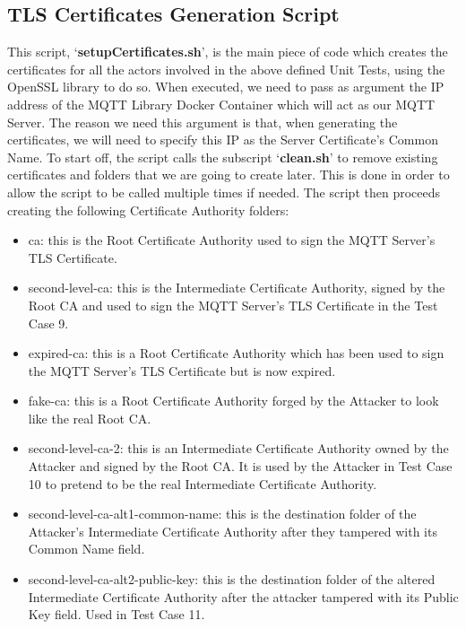 \documentclass[binding=0.6cm,noexaminfo]{sapthesis}
\begin{document}
\subsection{TLS Certificates Generation Script}

This script, `\textbf{setupCertificates.sh}', is the main piece of code which creates the certificates for all the actors involved in the above defined Unit Tests, using the OpenSSL library to do so. When executed, we need to pass as argument the IP address of the  MQTT Library Docker Container which will act as our MQTT Server. The reason we need this argument is that, when generating the certificates, we will need to specify this IP as the Server Certificate’s Common Name.
To start off, the script calls the subscript `\textbf{clean.sh}' to remove existing certificates and folders that we are going to create later. This is done in order to allow the script to be called multiple times if needed. The script then proceeds creating the following Certificate Authority folders:
\begin{itemize}
	\item ca: this is the Root Certificate Authority used to sign the MQTT Server’s TLS Certificate.
	\item second-level-ca: this is the Intermediate Certificate Authority, signed by the  Root CA and used to sign the MQTT Server’s TLS Certificate in the Test Case 9.
	\item expired-ca: this is a Root Certificate Authority which has been used to sign the MQTT Server’s TLS Certificate but is now expired.
	\item fake-ca: this is a Root Certificate Authority forged by the Attacker to look like the real Root CA.
	\item second-level-ca-2: this is an Intermediate Certificate Authority owned by the Attacker and signed by the Root CA. It is used by the Attacker in Test Case 10  to pretend to be the real Intermediate Certificate Authority.
	\item second-level-ca-alt1-common-name: this is the destination folder of the Attacker’s Intermediate Certificate Authority after they tampered with its Common Name field.
	\item second-level-ca-alt2-public-key: this is the destination folder of the altered  Intermediate Certificate Authority after the attacker tampered with its Public Key field. Used in Test Case 11.
\end{itemize}
\end{document}
